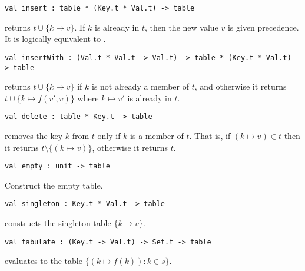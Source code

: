 \begin{gram}[insert]
\begin{verbatim}
val insert : table * (Key.t * Val.t) -> table
\end{verbatim}
 returns $t \cup \{k \mapsto v\}$. If $k$ is already
in $t$, then the new value $v$ is given precedence. It is logically equivalent
to .
\end{gram}

\begin{gram}[insertWith]
\begin{verbatim}
val insertWith : (Val.t * Val.t -> Val.t) -> table * (Key.t * Val.t) -> table
\end{verbatim}
 returns $t \cup \{k \mapsto v\}$ if $k$ is not
already a member of $t$, and otherwise it returns $t \cup \{k \mapsto f(v',v)\}$
where $k \mapsto v'$ is already in $t$.
\end{gram}

\begin{gram}[delete]
\begin{verbatim}
val delete : table * Key.t -> table
\end{verbatim}
 removes the key $k$ from $t$ only if $k$ is a member of $t$.
That is, if $(k \mapsto v) \in t$ then it returns
$t \setminus \{(k \mapsto v)\}$, otherwise it returns $t$.
\end{gram}

\begin{gram}[empty]
\begin{verbatim}
val empty : unit -> table
\end{verbatim}
Construct the empty table.
\end{gram}

\begin{gram}[singleton]
\label{gr:aug-ordtable-interface:singleton}
\begin{verbatim}
val singleton : Key.t * Val.t -> table
\end{verbatim}
 constructs the singleton table $\{k \mapsto v\}$.
\end{gram}

\begin{gram}[tabulate]
\begin{verbatim}
val tabulate : (Key.t -> Val.t) -> Set.t -> table
\end{verbatim}
 evaluates to the table $\{(k \mapsto f(k)) : k \in s\}$.
\end{gram}

